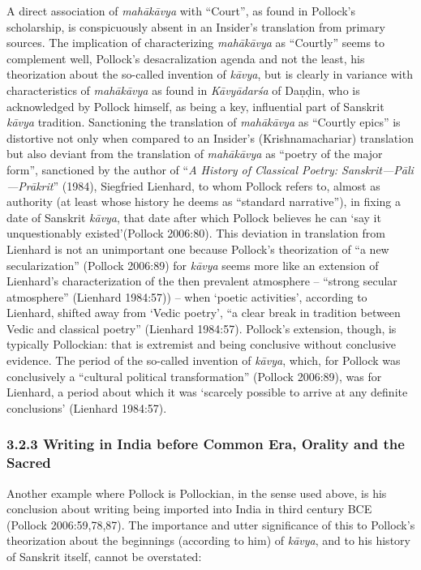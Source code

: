 A direct association of \textit{mahākāvya} with “Court”, as found in Pollock’s scholarship, is conspicuously absent in an Insider’s translation from primary sources. The implication of characterizing \textit{mahākāvya} as “Courtly” seems to complement well, Pollock’s desacralization agenda and not the least, his theorization about the so-called invention of \textit{kāvya}, but is clearly in variance with characteristics of \textit{mahākāvya} as found in \textit{Kāvyādarśa} of Daṇḍin, who is acknowledged by Pollock himself, as being a key, influential part of Sanskrit \textit{kāvya} tradition. Sanctioning the translation of \textit{mahākāvya} as “Courtly epics” is distortive not only when compared to an Insider’s (Krishnamachariar) translation but also deviant from the translation of \textit{mahākāvya} as “poetry of the major form”, sanctioned by the author of “\textit{A History of Classical Poetry: Sanskrit—Pāli—Prākrit}”\textit{} (1984), Siegfried Lienhard, to whom Pollock refers to, almost as authority (at least whose history he deems as “standard narrative”), in fixing a date of Sanskrit \textit{kāvya}, that date after which Pollock believes he can ‘say it unquestionably existed’(Pollock 2006:80). This deviation in translation from Lienhard is not an unimportant one because Pollock’s theorization of “a new secularization” (Pollock 2006:89) for \textit{kāvya} seems more like an extension of Lienhard’s characterization of the then prevalent atmosphere – “strong secular atmosphere” (Lienhard 1984:57)) – when ‘poetic activities’, according to Lienhard, shifted away from ‘Vedic poetry’, “a clear break in tradition between Vedic and classical poetry” (Lienhard 1984:57). Pollock’s extension, though, is typically Pollockian: that is extremist and being conclusive without conclusive evidence. The period of the so-called invention of \textit{kāvya}, which, for Pollock was conclusively a “cultural political transformation” (Pollock 2006:89), was for Lienhard, a period about which it was ‘scarcely possible to arrive at any definite conclusions’ (Lienhard 1984:57).


\subsubsection*{3.2.3 Writing in India before Common Era, Orality and the Sacred}

\vskip -9.9pt

Another example where Pollock is Pollockian, in the sense used above, is his conclusion about writing being imported into India in third century BCE (Pollock 2006:59,78,87). The importance and utter significance of this to Pollock’s theorization about the beginnings (according to him) of \textit{kāvya}, and to his history of Sanskrit itself, cannot be overstated:

